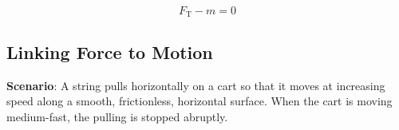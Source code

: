 \documentclass[]{exam}
\theoremstyle{definition}
\begin{document}
\begin{questions}
\begin{EnvUplevel}
{\begin{minipage}[c][5cm][c]{3.5cm}
    \vspace*{\fill}

    {\ifprintanswers 
    \color{red}
    \fi
    \begin{equation*}
        F_\mathrm{T} - m = 0
    \end{equation*}
    }
    
    \vspace*{\fill}
\end{minipage}}%
%
\end{EnvUplevel}




\end{questions}

\clearpage

\subsection*{Linking Force to Motion}

\textbf{Scenario}: A string pulls horizontally on a cart so that it moves at increasing speed along a smooth, frictionless, horizontal surface. When the cart is moving medium-fast, the pulling is stopped abruptly.
\end{document}
